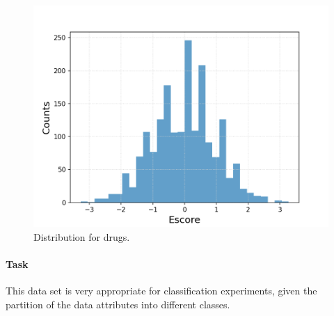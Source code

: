 \documentclass{article}
\begin{document}
\begin{figure}[h!]
\begin{minipage}[b]{0.32\textwidth}
	\end{minipage}
	\begin{minipage}[b]{0.32\textwidth}
		\includegraphics[width=\textwidth]{plots/drugsPlots/Escore.png}
	\end{minipage}
	\caption{Distribution for drugs.}
	\label{drugs}
\end{figure}



\paragraph{Task}

This data set is very appropriate for classification experiments, given the partition of the data attributes into different classes.




{}

\end{document}

